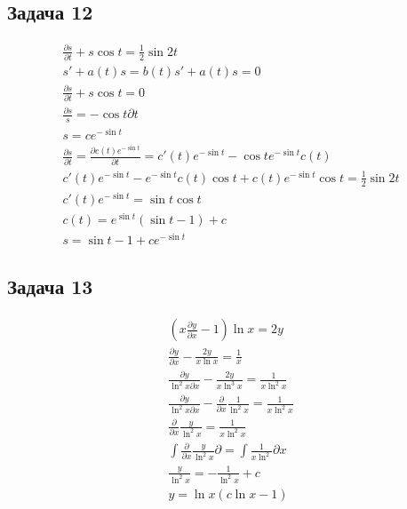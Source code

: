 \subsection*{Задача 12}
\begin{gather*}
	\frac{\partial s}{\partial t} + s \cos t = \frac{1}{2} \sin 2t\\
	s' + a(t)s = b(t)
	s' + a(t)s = 0\\
	\frac{\partial s}{\partial t} + s \cos t = 0\\
	\frac{\partial s}{s} = -\cos t \partial t\\
	s = c e^{-\sin t}\\
	\frac{\partial s}{\partial t} = \frac{\partial c(t) e^{-\sin t}}{\partial t} = c'(t) e^{-\sin t} - \cos t e^{-\sin t} c(t)\\
	c'(t)e^{-\sin t} - e^{-\sin t} c(t) \cos t + c(t) e^{-\sin t} \cos t = \frac{1}{2} \sin 2t\\
	c'(t) e^{-\sin t} = \sin t \cos t\\
	c(t) = e^{\sin t}(\sin t - 1) + c\\
	s = \sin t - 1 + c e^{-\sin t}
\end{gather*}

\subsection*{Задача 13}
\begin{gather*}
	\left(x \frac{\partial y}{\partial x} - 1\right) \ln x = 2y\\
	\frac{\partial y}{\partial x} - \frac{2y}{x \ln x} = \frac{1}{x}\\
	\frac{\partial y}{\ln^{2}x \partial x} - \frac{2y}{x \ln^{3} x} = \frac{1}{x \ln^{2} x}\\
	\frac{\partial y}{\ln^{2}x \partial x} - \frac{\partial }{\partial x}\frac{1}{\ln^{2} x} = \frac{1}{x \ln^{2} x}\\
	\frac{\partial }{\partial x} \frac{y}{\ln^2 x} = \frac{1}{x \ln^{2} x}\\
	\int \frac{\partial }{\partial x} \frac{y}{\ln^2 x} \partial = \int \frac{1}{x \ln^{2}} \partial x\\
	\frac{y}{\ln^2 x} = -\frac{1}{\ln^{2} x} +c\\
	y = \ln x (c \ln x -1)
\end{gather*}

